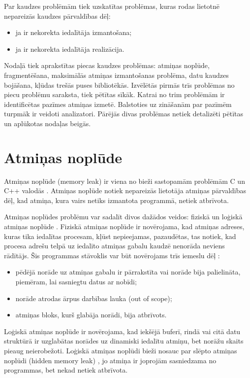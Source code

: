 ﻿ \label{sec:problems}
Par kaudzes problēmām tiek uzskatītas problēmas, kuras rodas lietotnē nepareizās kaudzes pārvaldības dēļ: 
\begin{itemize}
\item ja ir nekorekta iedalītāja izmantošana;
\item ja ir nekorekta iedalītāja realizācija.
\end{itemize}

Nodaļā tiek aprakstītas piecas kaudzes problēmas: atmiņas noplūde, fragmentēšana, maksimālās atmiņas izmantošanas problēma, datu kaudzes bojāšana, kļūdas trešās puses bibliotēkās.
Izvēlētās pirmās trīs problēmas no piecu problēmu saraksta, tiek pētītas sīkāk. 
Katrai no trim problēmām ir identificētas pazīmes atmiņas izmetē.
Balstoties uz zināšanām par pazīmēm turpmāk ir veidoti analizatori.
Pārējās divas problēmas netiek detalizēti pētītas un aplūkotas nodaļas beigās.

\section{Atmiņas noplūde}

Atmiņas noplūde (memory leak) ir viena no bieži sastopamām problēmām C un C++ valodās \cite{GNED}.
Atmiņas noplūde notiek nepareizās lietotāja atmiņas pārvaldības dēļ, kad atmiņa, kura vairs netiks izmantota programmā, netiek atbrīvota.

Atmiņas noplūdes problēmu var sadalīt divos dažādos veidos: fiziskā un loģiskā atmiņas noplūde \cite{JMMR}.
Fiziskā atmiņas noplūde ir novērojama, kad atmiņas adreses, kuras tika iedalītas procesam,  kļūst nepieejamas, pazaudētas, tas notiek, kad procesa adrešu telpā uz iedalīto atmiņas gabalu kaudzē nenorāda neviens rādītājs.
Šis programmas stāvoklis var būt novērojams trīs iemeslu dēļ \cite{JMMR}:
\begin{itemize}
\item pēdējā norāde uz atmiņas gabalu ir pārrakstīta vai norāde bija palielināta, piemēram, lai sasniegtu datus ar nobīdi;
\item norāde atrodas ārpus darbības lauka (out of scope);
\item atmiņas bloks, kurš glabāja norādi, bija atbrīvots.
\end{itemize}

Loģiskā atmiņas noplūde ir novērojama, kad iekšējā buferī, rindā vai citā datu struktūrā ir uzglabātas norādes uz dinamiski iedalītu atmiņu, bet norāžu skaits pieaug neierobežoti.
Loģiskā atmiņas noplūdi bieži nosauc par slēpto atmiņas noplūdi (hidden memory leak) \cite{RRUU}, jo atmiņa ir joprojām sasniedzama no programmas, bet nekad netiek atbrīvota.

